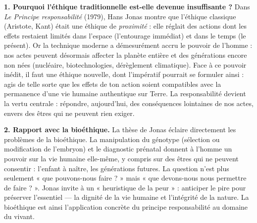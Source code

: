 \documentclass[11pt]{article}
\begin{document}
\begin{corrige}
\textbf{1. Pourquoi l'éthique traditionnelle est-elle devenue insuffisante ?} Dans \emph{Le Principe responsabilité} (1979), Hans Jonas montre que l'éthique classique (Aristote, Kant) était une éthique de \emph{proximité} : elle réglait des actions dont les effets restaient limités dans l'espace (l'entourage immédiat) et dans le temps (le présent). Or la technique moderne a démesurément accru le pouvoir de l'homme : nos actes peuvent désormais affecter la planète entière et des générations encore non nées (nucléaire, biotechnologies, dérèglement climatique). Face à ce pouvoir inédit, il faut une éthique nouvelle, dont l'impératif pourrait se formuler ainsi : agis de telle sorte que les effets de ton action soient compatibles avec la permanence d'une vie humaine authentique sur Terre. La responsabilité devient la vertu centrale : répondre, aujourd'hui, des conséquences lointaines de nos actes, envers des êtres qui ne peuvent rien exiger.

\textbf{2. Rapport avec la bioéthique.} La thèse de Jonas éclaire directement les problèmes de la bioéthique. La manipulation du génotype (sélection ou modification de l'embryon) et le diagnostic prénatal donnent à l'homme un pouvoir sur la vie humaine elle-même, y compris sur des êtres qui ne peuvent consentir : l'enfant à naître, les générations futures. La question n'est plus seulement « que pouvons-nous faire ? » mais « que devons-nous nous permettre de faire ? ». Jonas invite à un « heuristique de la peur » : anticiper le pire pour préserver l'essentiel — la dignité de la vie humaine et l'intégrité de la nature. La bioéthique est ainsi l'application concrète du principe responsabilité au domaine du vivant.
\end{corrige}
\end{document}
